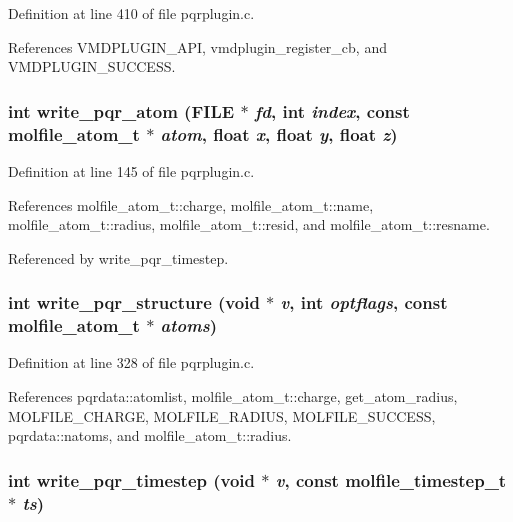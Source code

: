 Definition at line 410 of file pqrplugin.c.

References VMDPLUGIN\_\-API, vmdplugin\_\-register\_\-cb, and VMDPLUGIN\_\-SUCCESS.
\subsubsection{\setlength{\rightskip}{0pt plus 5cm}int write\_\-pqr\_\-atom (FILE $\ast$ {\em fd}, int {\em index}, const {\bf molfile\_\-atom\_\-t} $\ast$ {\em atom}, float {\em x}, float {\em y}, float {\em z})\hspace{0.3cm}{\tt  [static]}}\label{pqrplugin_8c_a11}




Definition at line 145 of file pqrplugin.c.

References molfile\_\-atom\_\-t::charge, molfile\_\-atom\_\-t::name, molfile\_\-atom\_\-t::radius, molfile\_\-atom\_\-t::resid, and molfile\_\-atom\_\-t::resname.

Referenced by write\_\-pqr\_\-timestep.
\subsubsection{\setlength{\rightskip}{0pt plus 5cm}int write\_\-pqr\_\-structure (void $\ast$ {\em v}, int {\em optflags}, const {\bf molfile\_\-atom\_\-t} $\ast$ {\em atoms})\hspace{0.3cm}{\tt  [static]}}\label{pqrplugin_8c_a17}




Definition at line 328 of file pqrplugin.c.

References pqrdata::atomlist, molfile\_\-atom\_\-t::charge, get\_\-atom\_\-radius, MOLFILE\_\-CHARGE, MOLFILE\_\-RADIUS, MOLFILE\_\-SUCCESS, pqrdata::natoms, and molfile\_\-atom\_\-t::radius.
\subsubsection{\setlength{\rightskip}{0pt plus 5cm}int write\_\-pqr\_\-timestep (void $\ast$ {\em v}, const {\bf molfile\_\-timestep\_\-t} $\ast$ {\em ts})\hspace{0.3cm}{\tt  [static]}}\label{pqrplugin_8c_a18}




